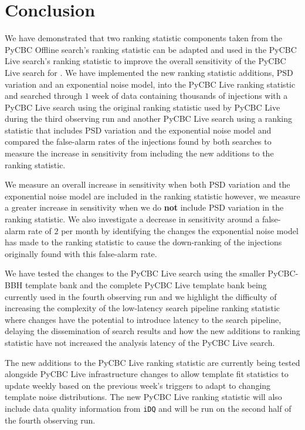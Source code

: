 \section{\label{5:sec:conclusion}Conclusion}

We have demonstrated that two ranking statistic components taken from the PyCBC Offline search's ranking statistic can be adapted and used in the PyCBC Live search's ranking statistic to improve the overall sensitivity of the PyCBC Live search for \gws. We have implemented the new ranking statistic additions, PSD variation and an exponential noise model, into the PyCBC Live ranking statistic and searched through $1$ week of \gwadj data containing thousands of \gwadj injections with a PyCBC Live search using the original ranking statistic used by PyCBC Live during the third observing run and another PyCBC Live search using a ranking statistic that includes PSD variation and the exponential noise model and compared the false-alarm rates of the injections found by both searches to measure the increase in sensitivity from including the new additions to the ranking statistic. 

We measure an overall increase in sensitivity when both PSD variation and the exponential noise model are included in the ranking statistic however, we measure a greater increase in sensitivity when we do \textbf{not} include PSD variation in the ranking statistic. We also investigate a decrease in sensitivity around a false-alarm rate of $2$ per month by identifying the changes the exponential noise model has made to the ranking statistic to cause the down-ranking of the injections originally found with this false-alarm rate.

We have tested the changes to the PyCBC Live search using the smaller PyCBC-BBH template bank and the complete PyCBC Live template bank being currently used in the fourth observing run and we highlight the difficulty of increasing the complexity of the low-latency search pipeline ranking statistic where changes have the potential to introduce latency to the search pipeline, delaying the dissemination of search results and how the new additions to ranking statistic have not increased the analysis latency of the PyCBC Live search.

The new additions to the PyCBC Live ranking statistic are currently being tested alongside PyCBC Live infrastructure changes to allow template fit statistics to update weekly based on the previous week's triggers to adapt to changing template noise distributions. The new PyCBC Live ranking statistic will also include data quality information from \texttt{iDQ} and will be run on the second half of the fourth observing run.















